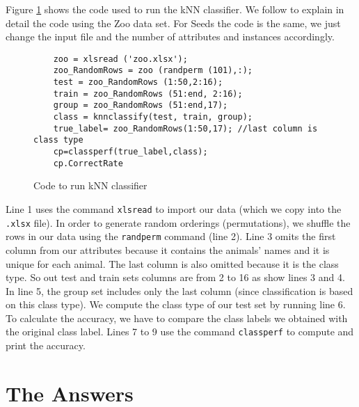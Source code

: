\documentclass[10pt]{scrartcl}
\begin{document}
Figure \ref{fig:code} shows the code used to run the kNN classifier.  We follow to explain in detail the code using the Zoo data set.  For Seeds the code is the same, we just change the input file and the number of attributes and instances accordingly.

\begin{figure}[t]
 \centering
 \begin{verbatim}
    zoo = xlsread ('zoo.xlsx'); 
    zoo_RandomRows = zoo (randperm (101),:); 
    test = zoo_RandomRows (1:50,2:16); 
    train = zoo_RandomRows (51:end, 2:16); 
    group = zoo_RandomRows (51:end,17); 
    class = knnclassify(test, train, group); 
    true_label= zoo_RandomRows(1:50,17); //last column is class type 
    cp=classperf(true_label,class); 
    cp.CorrectRate
 \end{verbatim}
 \caption{Code to run kNN classifier}\label{fig:code}
\end{figure}

Line 1 uses the command \texttt{xlsread} to import our data (which we copy into the \texttt{.xlsx} file).  In order to generate random orderings (permutations), we shuffle the rows in our data using the \texttt{randperm} command (line 2). Line 3 omits the first column from our attributes because it contains the animals' names and it is unique for each animal. The last column is also omitted because it is the class type. So out test and train sets columns are from 2 to 16 as show lines 3 and 4. In line 5, the group set includes only the last column (since classification is based on this class type).  We compute the class type of our test set by running line 6. To calculate the accuracy, we have to compare the class labels we obtained with the original class label. Lines 7 to 9 use the command \texttt{classperf} to compute and print the accuracy.

\section{The Answers}
\end{document}
